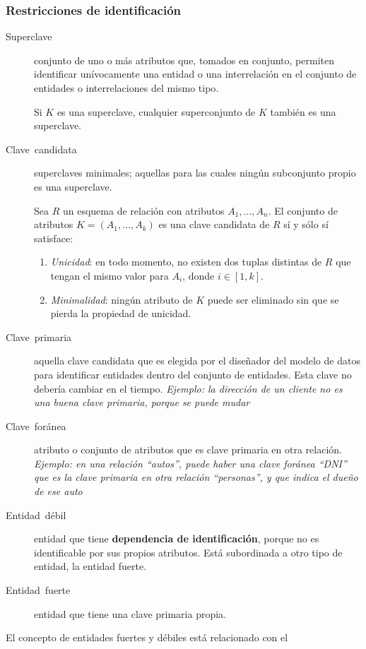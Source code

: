 \documentclass[a4paper, twoside]{article}
\begin{document}
\subsubsection{Restricciones de identificación}
\begin{description}
\item [{Superclave}] conjunto de uno o más atributos que, tomados en conjunto,
permiten identificar unívocamente una entidad o una interrelación
en el conjunto de entidades o interrelaciones del mismo tipo\emph{.}


Si $K$ es una superclave, cualquier superconjunto de $K$ también
es una superclave.

\item [{Clave~candidata}] superclaves minimales; aquellas para las cuales
ningún subconjunto propio es una superclave.


Sea $R$ un esquema de relación con atributos $A_{1},\dots,A_{n}$.
El conjunto de atributos $K=\left(A_{1},\dots,A_{k}\right)$ es una
clave candidata de $R$ sí y sólo sí satisface:
\begin{enumerate}
\item \emph{Unicidad}: en todo momento, no existen dos tuplas distintas
de $R$ que tengan el mismo valor para $A_{i}$, donde $i\in[1,k]$.
\item \emph{Minimalidad}: ningún atributo de $K$ puede ser eliminado sin
que se pierda la propiedad de unicidad.
\end{enumerate}
\item [{Clave~primaria}] aquella clave candidata que es elegida por el
diseñador del modelo de datos para identificar entidades dentro del
conjunto de entidades. Esta clave no debería cambiar en el tiempo.
\emph{Ejemplo: la dirección de un cliente no es una buena clave primaria,
porque se puede mudar}
\item [{Clave~foránea}] atributo o conjunto de atributos que es clave
primaria en otra relación. \emph{Ejemplo: en una relación ``autos'',
puede haber una clave foránea ``DNI'' que es la clave primaria en
otra relación ``personas'', y que indica el dueño de ese auto}
\item [{Entidad~débil}] entidad que tiene \textbf{dependencia de identificación},
porque no es identificable por sus propios atributos. Está subordinada
a otro tipo de entidad, la entidad fuerte.
\item [{Entidad~fuerte}] entidad que tiene una clave primaria propia.
\end{description}
El concepto de entidades fuertes y débiles está relacionado con el
\end{document}
